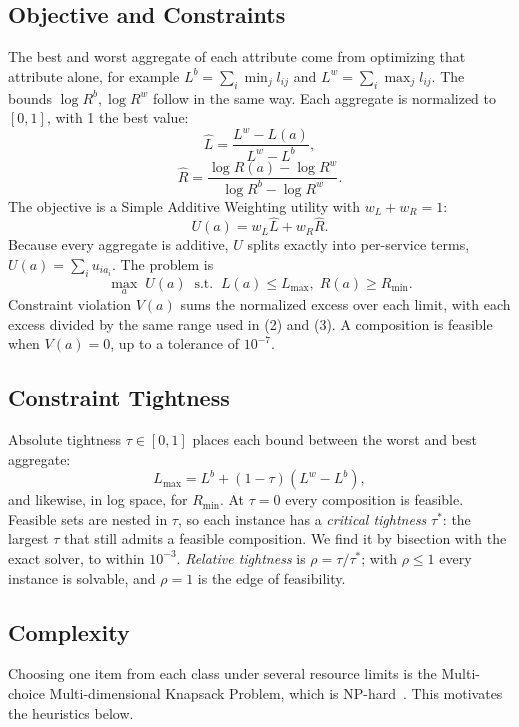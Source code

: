 \documentclass[conference]{IEEEtran}
\newcommand{\Lmax}{L_{\max}}
\newcommand{\Rmin}{R_{\min}}
\begin{document}
\subsection{Objective and Constraints}
The best and worst aggregate of each attribute come from optimizing that attribute alone, for example $L^{b} = \sum_i \min_j l_{ij}$ and $L^{w} = \sum_i \max_j l_{ij}$. The bounds $\log R^{b}, \log R^{w}$ follow in the same way. Each aggregate is normalized to $[0,1]$, with 1 the best value:
\begin{equation}
\hat L = \frac{L^{w}-L(a)}{L^{w}-L^{b}},
\end{equation}
\begin{equation}
\hat R = \frac{\log R(a)-\log R^{w}}{\log R^{b}-\log R^{w}}.
\end{equation}
The objective is a Simple Additive Weighting utility with $w_L+w_R=1$:
\begin{equation}
U(a) = w_L\hat L + w_R\hat R.
\end{equation}
Because every aggregate is additive, $U$ splits exactly into per-service terms, $U(a)=\sum_i u_{i a_i}$. The problem is
\begin{equation}
\max_{a}\; U(a) \;\;\text{s.t.}\;\; L(a)\le \Lmax,\; R(a)\ge \Rmin.
\end{equation}
Constraint violation $V(a)$ sums the normalized excess over each limit, with each excess divided by the same range used in (2) and (3). A composition is feasible when $V(a)=0$, up to a tolerance of $10^{-7}$.

\subsection{Constraint Tightness}
Absolute tightness $\tau\in[0,1]$ places each bound between the worst and best aggregate:
\begin{equation}
\Lmax = L^{b} + (1-\tau)(L^{w}-L^{b}),
\end{equation}
and likewise, in log space, for $\Rmin$. At $\tau=0$ every composition is feasible. Feasible sets are nested in $\tau$, so each instance has a \emph{critical tightness} $\tau^{*}$: the largest $\tau$ that still admits a feasible composition. We find it by bisection with the exact solver, to within $10^{-3}$. \emph{Relative tightness} is $\rho = \tau / \tau^{*}$; with $\rho\le 1$ every instance is solvable, and $\rho=1$ is the edge of feasibility.

\subsection{Complexity}
Choosing one item from each class under several resource limits is the Multi-choice Multi-dimensional Knapsack Problem, which is NP-hard~\cite{yu2007}. This motivates the heuristics below.
\end{document}
